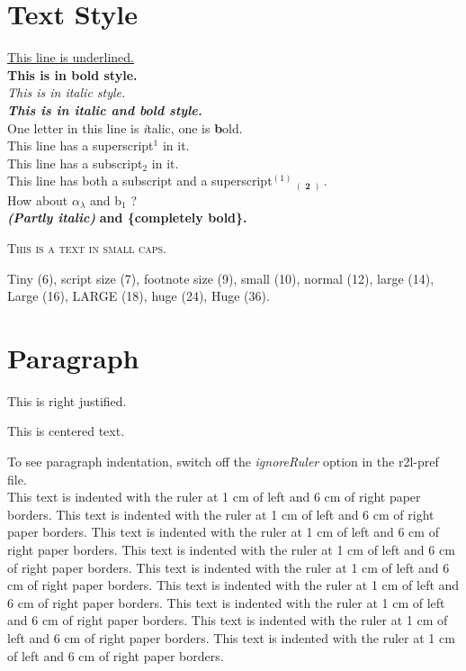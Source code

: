 \documentclass{article}
\begin{document}
\section*{Text Style}
{\underline {This line is underlined.}}\\{}
\textbf{This is in bold style.}\\{}
\textit{This is in italic style.}\\{}
\textbf{\textit{This is in italic and bold style.}}\\{}
One letter in this line is \textit{i}talic, one is \textbf{b}old.\\{}
This line has a superscript$ ^{1} $  in it.\\{}
This line has a subscript$ _{2} $  in it.\\{}
This line has both a subscript and a superscript$ ^{(1)} $ $ _{(} $ $ _{\mathbf{2}} $ $ _{)} $ .\\{}
How about \ensuremath{\alpha}$ _{\ensuremath{\lambda}} $  and b$ _{1} $ ?\\{}
\textbf{\textit{(Partly italic)}} \textbf{and \{completely bold\}.}


\textsc{This is a text in small caps.}

{\scriptsize Tiny (6),} {\footnotesize script size (7),} {\small footnote size (9),} small 
(10), normal (12), {\large large (14),} {\Large Large (16),} {\LARGE LARGE (18),} {\huge huge 
(24),} {\Huge Huge (36).}



\section*{Paragraph}

\begin{flushright}
This is right justified.


\end{flushright}

\begin{center}
This is centered text.


\end{center}

To see paragraph indentation, switch off the \textit{ignoreRuler} 
option in the r2l-pref file.\\{}
This text is indented with the ruler at 1 cm of left and 6 cm 
of right paper borders. This text is indented with the ruler at 
1 cm of left and 6 cm of right paper borders. This text is indented with 
the ruler at 1 cm of left and 6 cm of right paper borders. This 
text is indented with the ruler at 1 cm of left and 6 cm of right 
paper borders. This text is indented with the ruler at 1 cm of 
left and 6 cm of right paper borders. This text is indented with 
the ruler at 1 cm of left and 6 cm of right paper borders. This 
text is indented with the ruler at 1 cm of left and 6 cm of right 
paper borders. This text is indented with the ruler at 1 cm of 
left and 6 cm of right paper borders. This text is indented with 
the ruler at 1 cm of left and 6 cm of right paper borders.
\end{document}
